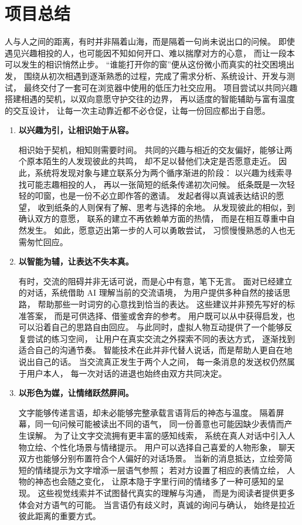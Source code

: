 \clearpage
\section{项目总结}

人与人之间的距离，有时并非隔着山海，而是隔着一句尚未说出口的问候。
即使遇见兴趣相投的人，也可能因不知如何开口、难以揣摩对方的心意，
而让一段本可以发生的相识悄然止步。
“谁能打开你的窗”便从这份微小而真实的社交困境出发，
围绕从初次相遇到逐渐熟悉的过程，完成了需求分析、系统设计、开发与测试，
最终交付了一套可在浏览器中使用的低压力社交应用。
项目尝试以共同兴趣搭建相遇的契机，以双向意愿守护交往的边界，
再以适度的智能辅助与富有温度的交互设计，
让每一次主动靠近都不必仓促，让每一份回应都出于自愿。

\begin{enumerate}
    \item \textbf{以兴趣为引，让相识始于从容。}

    相识始于契机，相知则需要时间。
    共同的兴趣与相近的交友偏好，能够让两个原本陌生的人发现彼此的共鸣，
    却不足以替他们决定是否愿意走近。
    因此，系统将发现对象与建立联系分为两个循序渐进的阶段：
    以兴趣为线索寻找可能志趣相投的人，
    再以一张简短的纸条传递初次问候。
    纸条既是一次轻轻的叩窗，也是一份不必立即作答的邀请。
    发起者得以真诚表达结识的愿望，
    收到纸条的人则保有了解、思考与选择的余地。
    从发现彼此的相似，到确认双方的意愿，
    联系的建立不再依赖单方面的热情，
    而是在相互尊重中自然发生。
    如此，愿意迈出第一步的人可以勇敢尝试，
    习惯慢慢熟悉的人也无需匆忙回应。

    \item \textbf{以智能为辅，让表达不失本真。}

    有时，交流的阻碍并非无话可说，而是心中有意，笔下无言。
    面对已经建立的对话，系统借助 AI 理解当前的交流语境，
    为用户提供多种自然的接话思路，
    帮助那些一时词穷的心意找到恰当的表达。
    这些建议并非预先写好的标准答案，
    而是可供选择、借鉴或舍弃的参考。
    用户既可以从中获得启发，也可以沿着自己的思路自由回应。
    与此同时，虚拟人物互动提供了一个能够反复尝试的练习空间，
    让用户在真实交流之外探索不同的表达方式，
    逐渐找到适合自己的沟通节奏。
    智能技术在此并非代替人说话，而是帮助人更自在地说出自己的话。
    当交流真正发生于两个人之间，
    每一条消息的发送权仍然属于用户本人，
    每一次对话的进退也始终由双方共同决定。

    \item \textbf{以形色为媒，让情绪跃然屏间。}

    文字能够传递言语，却未必能够完整承载言语背后的神态与温度。
    隔着屏幕，同一句问候可能被读出不同的语气，
    同一份善意也可能因缺少表情而产生误解。
    为了让文字交流拥有更丰富的感知线索，
    系统在真人对话中引入人物立绘、个性化场景与情绪提示。
    用户可以选择自己喜爱的人物形象，
    聊天双方也能够分别布置符合个人偏好的对话场景。
    当新的消息抵达，立绘旁简短的情绪提示为文字增添一层语气参照；
    若对方设置了相应的表情立绘，
    人物的神态也会随之变化，
    让原本隐于字里行间的情绪多了一种可感知的呈现。
    这些视觉线索并不试图替代真实的理解与沟通，
    而是为阅读者提供更多体会对方语气的可能。
    当言语仍有歧义时，真诚的询问与确认，
    始终是拉近彼此距离的重要方式。


\end{enumerate}
